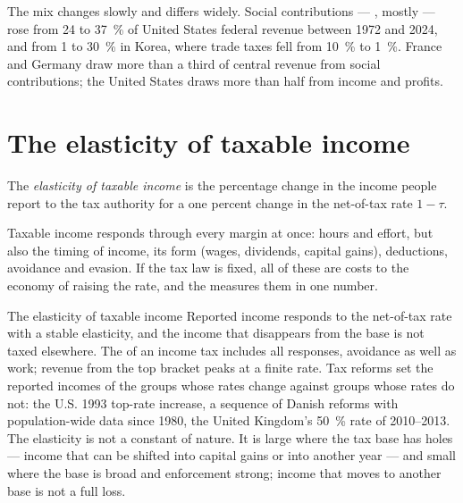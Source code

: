 The mix changes slowly and differs widely. Social contributions --- ,
mostly --- rose from 24 to 37~\% of United States federal revenue between 1972 and
2024, and from 1 to 30~\% in Korea, where trade taxes fell from 10~\% to 1~\%. France
and Germany draw more than a third of central revenue from social contributions;
the United States draws more than half from income and profits.

\section{The elasticity of taxable income}\label{sec:b3:efficiency-cost-of-taxation:eti}

\begin{definition}\label{def:b3:efficiency-cost-of-taxation:eti}
The \emph{elasticity of taxable income} is the percentage change in the income
people report to the tax authority for a one percent change in the net-of-tax rate
$1 - \tau$.
\end{definition}

Taxable income responds through every margin at once: hours and effort, but also
the timing of income, its form (wages, dividends, capital gains), deductions,
avoidance and evasion. If the tax law is fixed, all of these are costs to the
economy of raising the rate, and the  measures them in
one number.

\begin{model}{The elasticity of taxable income}
\assumes Reported income responds to the net-of-tax rate with a stable elasticity,
and the income that disappears from the base is not taxed elsewhere.
\predicts The  of an income tax includes all responses, avoidance as
well as work; revenue from the top bracket peaks at a finite rate.
\tested Tax reforms set the reported incomes of the groups whose rates change
against groups whose rates do not: the U.S. 1993 top-rate increase, a sequence of
Danish reforms with population-wide data since 1980, the United Kingdom's 50~\% rate
of 2010--2013. %
\breaks The elasticity is not a constant of nature. It is large where the tax base
has holes --- income that can be shifted into capital gains or into another year ---
and small where the base is broad and enforcement strong; income that moves to
another base is not a full loss.
\end{model}

